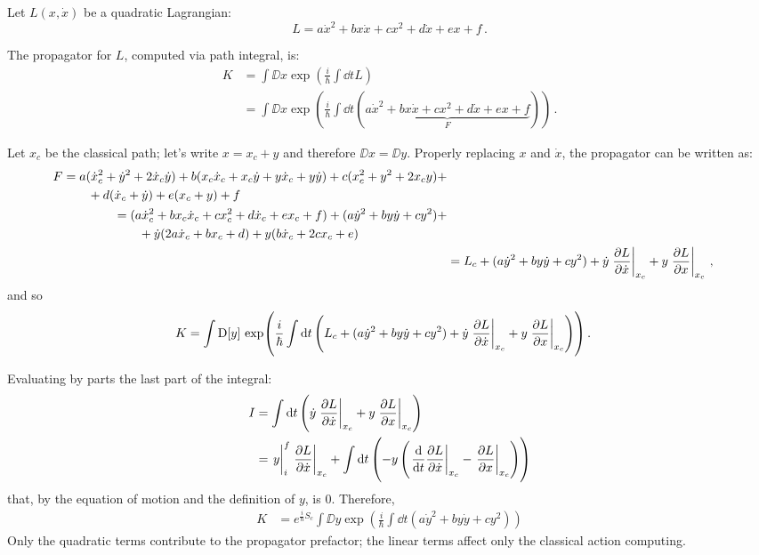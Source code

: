 \documentclass[main.tex]{subfiles}
\begin{document}
Let \(L(x,\dot{x})\) be a quadratic Lagrangian:
\begin{equation}
  L = a\dot{x}^2 + bx\dot{x} + cx^2 + d\dot{x} + ex + f
  \,.
\end{equation}

The propagator for $L$, computed via path integral, is:
%
\begin{subequations}
  \begin{align}
    K &= \int\DD{x} \exp(\frac{i}{\hbar}\int \dd{t} L) \\
    &= \int\DD{x} \exp(\frac{i}{\hbar}\int \dd{t} ( \underbrace{a\dot{x}^2 + bx\dot{x} + cx^2 + d\dot{x} + ex + f}_F) )
    \,.
  \end{align}
\end{subequations}

Let $x_c$ be the classical path; let's write $x = x_c + y$ and therefore $\DD{x} = \DD{y}$. Properly replacing $x$ and $\dot{x}$, the propagator can be written as:
%
\begin{subequations}
\begin{align}
\begin{split}
F &= a (\dot{x}_c^2+\dot{y}^2+2\dot{x}_c\dot{y}) + b(x_c\dot{x}_c+x_c\dot{y}+y\dot{x}_c+y\dot{y}) + c(x_c^2+y^2+2x_cy) +\\&\qquad+ d(\dot{x}_c+\dot{y}) + e(x_c+y) + f
\end{split} \\
\begin{split}
&= (a\dot{x}_c^2+bx_c\dot{x}_c+cx_c^2+d\dot{x}_c+ex_c+f) + (a\dot{y}^2 + by\dot{y} + cy^2) + \\&\qquad + \dot{y} ( 2a\dot{x}_c + bx_c + d ) +y (b\dot{x}_c + 2cx_c + e) \end{split}\\
&= L_c + (a\dot{y}^2 + by\dot{y} + cy^2) + \dot{y} \eval{\pdv{L}{\dot{x}}}_{x_c} + y \eval{\pdv{L}{x}}_{x_c}
\,,
\end{align}
\end{subequations}
%
and so
%
\begin{align}
K &= \int\DD{y} \exp( \frac{i}{\hbar}\int \dd{t} \left( L_c + (a\dot{y}^2 + by\dot{y} + cy^2) + \dot{y} \eval{\pdv{L}{\dot{x}}}_{x_c} + y \eval{\pdv{L}{x}}_{x_c} \right) )
\,.
\end{align}

Evaluating by parts the last part of the integral:
%
\begin{align}
I &= \int \dd{t} \left( \dot{y} \eval{\pdv{L}{\dot{x}}}_{x_c} + y \eval{\pdv{L}{x}}_{x_c} \right) \\
&= \eval{y}_i^f \eval{\pdv{L}{\dot{x}}}_{x_c} + \int \dd{t} \left( -y \left( \eval{\dv{t}\pdv{L}{\dot{x}}}_{x_c} - \eval{\pdv{L}{x}}_{x_c} \right) \right)
\end{align}
that, by the equation of motion and the definition of $y$, is 0. Therefore,
\begin{align}
K &= e^{\frac{i}{\hbar} S_c }\int \DD{y} \exp( \frac{i}{\hbar} \int \dd{t} (a\dot{y}^2 + by\dot{y} + cy^2) )
\end{align}
Only the quadratic terms contribute to the propagator prefactor; the linear terms affect only the classical action computing.
\end{document}
